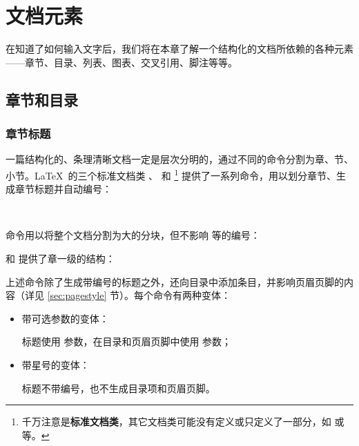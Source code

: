 \chapter{文档元素}\label{chap:elements}

\begin{intro}
在知道了如何输入文字后，我们将在本章了解一个结构化的文档所依赖的各种元素——章节、目录、列表、图表、交叉引用、脚注等等。
\end{intro}

\section{章节和目录}\label{sec:secs}

\subsection{章节标题}\label{subsec:secs}

一篇结构化的、条理清晰文档一定是层次分明的，通过不同的命令分割为章、节、小节。\LaTeX\ 的三个标准文档类 、 和 %
\footnote{千万注意是\textbf{标准文档类}，其它文档类可能没有定义或只定义了一部分，如  或  等。}%
提供了一系列命令，用以划分章节、生成章节标题并自动编号：
\begin{command}
 \quad
{} \quad
{} \\
 \quad
{}
\end{command}

 命令用以将整个文档分割为大的分块，但不影响  等的编号：
\begin{command}
\end{command}

 和  提供了章一级的结构：
\begin{command}
\end{command}

上述命令除了生成带编号的标题之外，还向目录中添加条目，并影响页眉页脚的内容（详见 \ref{sec:pagestyle} 节）。每个命令有两种变体：
\begin{itemize}
  \item 带可选参数的变体：\par
  标题使用  参数，在目录和页眉页脚中使用  参数；
  \item 带星号的变体：\par
  标题不带编号，也不生成目录项和页眉页脚。
\end{itemize}

